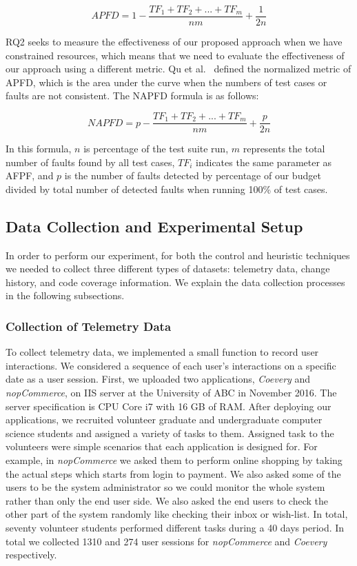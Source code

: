 \[
{APFD = 1- \frac {{TF_{1} + TF_{2} + ... + TF_{m}}} {nm} + \frac{1}{2n}}
\]
	
RQ2 seeks to measure the effectiveness of our proposed approach
when we have constrained resources, which means that we need to evaluate 
the effectiveness of our approach using a different metric. 
Qu et al.~\cite{myra} defined the normalized metric of APFD, which is the
area under the curve when the numbers of test cases or faults are not consistent. 
The NAPFD formula is as follows:
	
\[
{NAPFD = p- \frac {{TF_{1} + TF_{2} + ... + TF_{m}}} {nm} + \frac{p}{2n}}
\]
	
In this formula, $n$ is percentage of the test suite run, 
$m$ represents the total number of faults found by all test cases,
$TF_{i}$ indicates the same parameter as AFPF, and 
$p$ is the number of faults detected by percentage of our
budget divided by total number of detected faults when 
running 100\% of test cases.  
	
\subsection{Data Collection and Experimental Setup}
\label{data-collection}
In order to perform our experiment, for both the control and heuristic techniques
we needed to collect three different types of datasets: telemetry data, change 
history, and code coverage information. We explain the data collection processes
in the following subsections.

\subsubsection{Collection of Telemetry Data}
To collect telemetry data, we implemented a small function to record user interactions. 
We considered a sequence of each user's interactions on a specific date as a user session.
First, we uploaded two applications, {\em Coevery} and {\em nopCommerce}, on IIS server 
at the University of ABC in November 2016. 
The server specification is CPU Core i7 with 16 GB of RAM.
After deploying our applications, we recruited volunteer graduate and undergraduate
computer science students and assigned a variety of tasks to them. 
Assigned task to the volunteers were simple scenarios that each application is designed for.
For example, in {\em nopCommerce} we asked them to perform online shopping 
by taking the actual steps which starts from login to payment. We also asked some of 
the users to be the system administrator so we could monitor the whole system 
rather than only the end user side.
We also asked the end users to check the other part of the system randomly like
checking their inbox or wish-list.  
In total, seventy volunteer students performed different tasks during a 40 days period.  
In total we collected 1310 and 274 user sessions for {\em nopCommerce} 
and {\em Coevery} respectively. 
 
